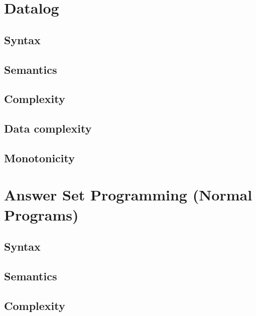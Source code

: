 \documentclass[12pt]{extarticle}
\begin{document}
\section{Datalog}

\subsection{Syntax}

\subsection{Semantics}

\subsection{Complexity}

\subsection{Data complexity}

\subsection{Monotonicity}

\section{Answer Set Programming (Normal Programs)}


\subsection{Syntax}

\subsection{Semantics}

\subsection{Complexity}


\end{document}
